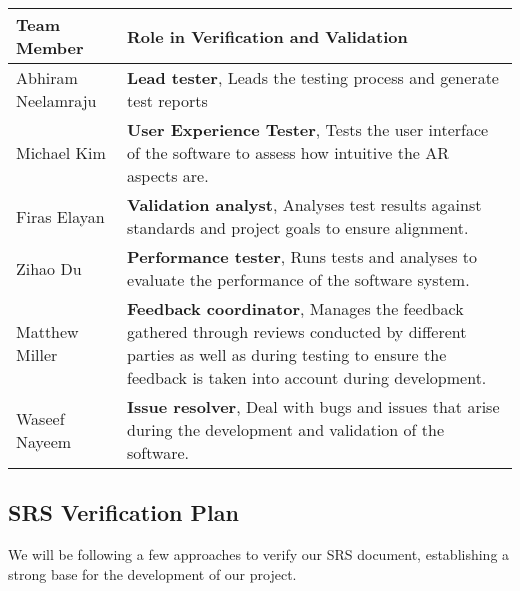 \documentclass[12pt, titlepage]{article}
\begin{document}
\begin{table}[H]
  \centering
  \begin{tabular}{|p{}|p{}|}
  \hline
  \textbf{Team Member} & \textbf{Role in Verification and Validation} \\
  \hline
  Abhiram Neelamraju & \textbf{Lead tester}, Leads the testing process and generate test reports \\
  \hline
  Michael Kim & \textbf{User Experience Tester}, Tests the user interface of the software to assess how intuitive the AR aspects are. \\
  \hline
  Firas Elayan & \textbf{Validation analyst}, Analyses test results against standards and project goals to ensure alignment. \\
  \hline
  Zihao Du & \textbf{Performance tester}, Runs tests and analyses to evaluate the performance of the software system. \\
  \hline
  Matthew Miller & \textbf{Feedback coordinator}, Manages the feedback gathered through reviews conducted by different parties as well as during testing to ensure the feedback is taken into account during development. \\
  \hline
  Waseef Nayeem & \textbf{Issue resolver}, Deal with bugs and issues that arise during the development and validation of the software. \\
  \hline
  \end{tabular}
\end{table}    

\subsection{SRS Verification Plan}

We will be following a few approaches to verify our SRS document, establishing a strong base for the development of our project.
\end{document}
